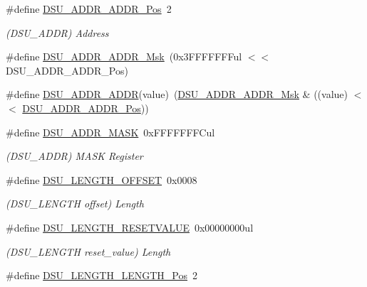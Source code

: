\begin{DoxyCompactItemize}
\#define \mbox{\hyperlink{group___s_a_m_d21___d_s_u_ga028619d29a30f3abc4ff67ce0797952c}{D\+S\+U\+\_\+\+A\+D\+D\+R\+\_\+\+A\+D\+D\+R\+\_\+\+Pos}}~2
\begin{DoxyCompactList}\small\item\em (D\+S\+U\+\_\+\+A\+D\+DR) Address \end{DoxyCompactList}\item 
\#define \mbox{\hyperlink{group___s_a_m_d21___d_s_u_gabd32d0522daddb84bbf02228c190fc49}{D\+S\+U\+\_\+\+A\+D\+D\+R\+\_\+\+A\+D\+D\+R\+\_\+\+Msk}}~(0x3\+F\+F\+F\+F\+F\+F\+Ful $<$$<$ D\+S\+U\+\_\+\+A\+D\+D\+R\+\_\+\+A\+D\+D\+R\+\_\+\+Pos)
\item 
\#define \mbox{\hyperlink{group___s_a_m_d21___d_s_u_ga87f4d8a3d868be1f3d8cc880a0b67b65}{D\+S\+U\+\_\+\+A\+D\+D\+R\+\_\+\+A\+D\+DR}}(value)~(\mbox{\hyperlink{group___s_a_m_d21___d_s_u_gabd32d0522daddb84bbf02228c190fc49}{D\+S\+U\+\_\+\+A\+D\+D\+R\+\_\+\+A\+D\+D\+R\+\_\+\+Msk}} \& ((value) $<$$<$ \mbox{\hyperlink{group___s_a_m_d21___d_s_u_ga028619d29a30f3abc4ff67ce0797952c}{D\+S\+U\+\_\+\+A\+D\+D\+R\+\_\+\+A\+D\+D\+R\+\_\+\+Pos}}))
\item 
\#define \mbox{\hyperlink{group___s_a_m_d21___d_s_u_gadfb5c4d624bfbe3736315ad712fc3238}{D\+S\+U\+\_\+\+A\+D\+D\+R\+\_\+\+M\+A\+SK}}~0x\+F\+F\+F\+F\+F\+F\+F\+Cul
\begin{DoxyCompactList}\small\item\em (D\+S\+U\+\_\+\+A\+D\+DR) M\+A\+SK Register \end{DoxyCompactList}\item 
\#define \mbox{\hyperlink{group___s_a_m_d21___d_s_u_gaa51326ede30d0596a90a8758846527b9}{D\+S\+U\+\_\+\+L\+E\+N\+G\+T\+H\+\_\+\+O\+F\+F\+S\+ET}}~0x0008
\begin{DoxyCompactList}\small\item\em (D\+S\+U\+\_\+\+L\+E\+N\+G\+TH offset) Length \end{DoxyCompactList}\item 
\#define \mbox{\hyperlink{group___s_a_m_d21___d_s_u_ga055ab4dd190617fd309ed8db03c185ac}{D\+S\+U\+\_\+\+L\+E\+N\+G\+T\+H\+\_\+\+R\+E\+S\+E\+T\+V\+A\+L\+UE}}~0x00000000ul
\begin{DoxyCompactList}\small\item\em (D\+S\+U\+\_\+\+L\+E\+N\+G\+TH reset\+\_\+value) Length \end{DoxyCompactList}\item 
\#define \mbox{\hyperlink{group___s_a_m_d21___d_s_u_ga6aa7babac0719eb769c08ca1a945aa57}{D\+S\+U\+\_\+\+L\+E\+N\+G\+T\+H\+\_\+\+L\+E\+N\+G\+T\+H\+\_\+\+Pos}}~2

\end{DoxyCompactItemize}
